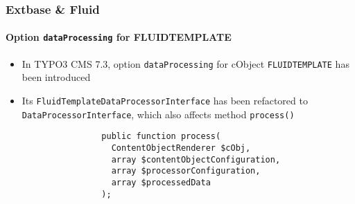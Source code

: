 \begin{frame}[fragile]
	\frametitle{Extbase \& Fluid}
	\framesubtitle{Option \texttt{dataProcessing} for FLUIDTEMPLATE}

	\lstset{basicstyle=\tiny\ttfamily}

	\begin{itemize}

		\item In TYPO3 CMS 7.3, option \texttt{dataProcessing} for cObject \texttt{FLUIDTEMPLATE} has been introduced

		\item Its \texttt{FluidTemplateDataProcessorInterface} has been refactored to \texttt{DataProcessorInterface},
			which also affects method \texttt{process()}

			\begin{lstlisting}
				public function process(
				  ContentObjectRenderer $cObj,
				  array $contentObjectConfiguration,
				  array $processorConfiguration,
				  array $processedData
				);
			\end{lstlisting}

	\end{itemize}

	\breakingchange

\end{frame}

